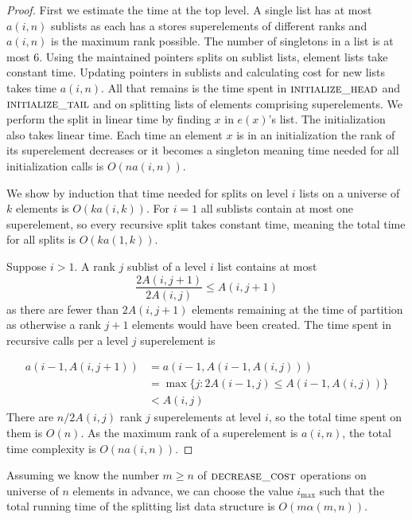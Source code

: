 \begin{proof}
    First we estimate the time at the top level. A single list has at most $a(i,n)$ sublists as each has a stores superelements of different ranks and $a(i,n)$ is the maximum rank possible. The number of singletons in a list is at most $6$. Using the maintained pointers splits on sublist lists, element lists take constant time. Updating pointers in sublists and calculating cost for new lists takes time $a(i,n)$. All that remains is the time spent in $\textsc{initialize\_head}$ and $\textsc{initialize\_tail}$ and on splitting lists of elements comprising superelements. We perform the split in linear time by finding $x$ in $e(x)$'s list. The initialization also takes linear time. Each time an element $x$ is in an initialization the rank of its superelement decreases or it becomes a singleton meaning time needed for all initialization calls is $O(na(i,n))$.

    We show by induction that time needed for splits on level $i$ lists on a universe of $k$ elements is $O(ka(i,k))$. For $i=1$ all sublists contain at most one superelement, so every recursive split takes constant time, meaning the total time for all splits is $O(ka(1,k))$.

    Suppose $i > 1$. A rank $j$ sublist of a level $i$ list contains at most 
    \[\frac{2A(i,j+1)}{2A(i,j)} \leq A(i,j+1)\]
    as there are fewer than $2A(i,j+1)$ elements remaining at the time of partition as otherwise a rank $j+1$ elements would have been created. The time spent in recursive calls per a level $j$ superelement is

    \begin{align*}
        a(i-1,A(i,j+1)) &= a(i-1, A(i-1,A(i,j))) \\
        &= \max \{ j: 2A(i-1,j) \leq A(i-1,A(i,j)) \} \\
        &< A(i,j) 
    \end{align*}
    There are $n / 2A(i,j)$ rank $j$ superelements at level $i$, so the total time spent on them is $O(n)$. As the maximum rank of a superelement is $a(i,n)$, the total time complexity is $O(na(i,n))$.

\end{proof}

\begin{theorem}\label{thm:sfm_time}
    Assuming we know the number $m \geq n$ of $\textsc{decrease\_cost}$ operations on universe of $n$ elements in advance, we can choose the value $i_{\max}$ such that the total running time of the splitting list data structure is $O(m\alpha(m,n))$.
\end{theorem}

